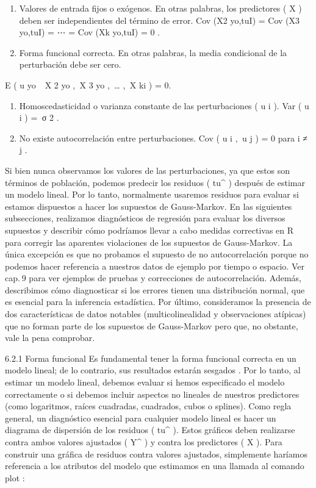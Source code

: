 \documentclass[
]{book}
\begin{document}
\begin{enumerate}
\def\labelenumi{\arabic{enumi}.}
\item
  Valores de entrada fijos o exógenos. En otras palabras, los predictores ( X ) deben ser independientes del término de error. Cov (X2 yo,tuI) = Cov (X3 yo,tuI) = ⋯ = Cov (Xk yo,tuI) = 0 .
\item
  Forma funcional correcta. En otras palabras, la media condicional de la perturbación debe ser cero.
\end{enumerate}

E ( u yo  \textbar{}  X 2 yo ,  X 3 yo ,  \ldots{} ,  X ki ) = 0.

\begin{enumerate}
\def\labelenumi{\arabic{enumi}.}
\setcounter{enumi}{2}
\item
  Homoscedasticidad o varianza constante de las perturbaciones ( u i ). Var ( u i ) =  σ 2 .
\item
  No existe autocorrelación entre perturbaciones. Cov ( u i ,  u j ) = 0 para i ≠ j .
\end{enumerate}

Si bien nunca observamos los valores de las perturbaciones, ya que estos son términos de población, podemos predecir los residuos ( tu\^{} ) después de estimar un modelo lineal. Por lo tanto, normalmente usaremos residuos para evaluar si estamos dispuestos a hacer los supuestos de Gauss-Markov. En las siguientes subsecciones, realizamos diagnósticos de regresión para evaluar los diversos supuestos y describir cómo podríamos llevar a cabo medidas correctivas en R para corregir las aparentes violaciones de los supuestos de Gauss-Markov. La única excepción es que no probamos el supuesto de no autocorrelación porque no podemos hacer referencia a nuestros datos de ejemplo por tiempo o espacio. Ver cap. 9 para ver ejemplos de pruebas y correcciones de autocorrelación. Además, describimos cómo diagnosticar si los errores tienen una distribución normal, que es esencial para la inferencia estadística. Por último, consideramos la presencia de dos características de datos notables (multicolinealidad y observaciones atípicas) que no forman parte de los supuestos de Gauss-Markov pero que, no obstante, vale la pena comprobar.

6.2.1 Forma funcional
Es fundamental tener la forma funcional correcta en un modelo lineal; de lo contrario, sus resultados estarán sesgados . Por lo tanto, al estimar un modelo lineal, debemos evaluar si hemos especificado el modelo correctamente o si debemos incluir aspectos no lineales de nuestros predictores (como logaritmos, raíces cuadradas, cuadrados, cubos o splines). Como regla general, un diagnóstico esencial para cualquier modelo lineal es hacer un diagrama de dispersión de los residuos ( tu\^{} ). Estos gráficos deben realizarse contra ambos valores ajustados ( Y\^{} ) y contra los predictores ( X ). Para construir una gráfica de residuos contra valores ajustados, simplemente haríamos referencia a los atributos del modelo que estimamos en una llamada al comando plot :
\end{document}
